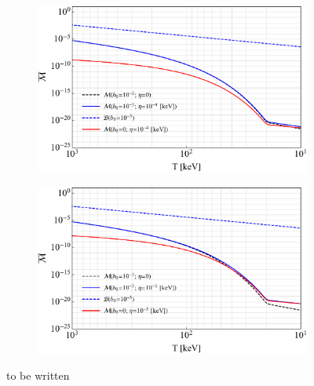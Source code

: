 \begin{figure}[ht]
    \centering
    \begin{subfigure}[b]{0.49\textwidth}
        \includegraphics[width=\textwidth]{SpinLowFugacity.pdf}
    \end{subfigure}
    \hfill
    \begin{subfigure}[b]{0.49\textwidth}
        \includegraphics[width=\textwidth]{SpinMidFugacity.pdf}
    \end{subfigure}
    \caption{to be written}
    \label{fig:spin}
\end{figure}
